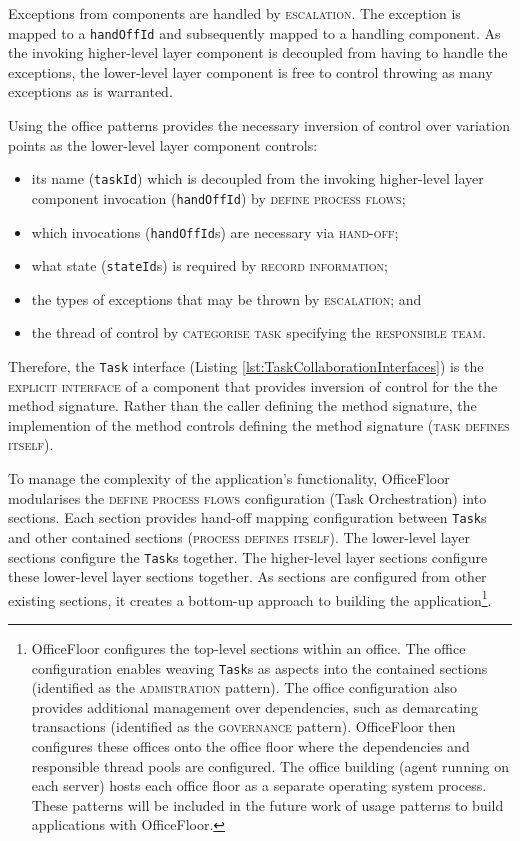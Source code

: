 \documentclass[prodmode]{style/acmlarge}
\begin{document}
Exceptions from components are handled by \textsc{escalation}.  The
exception is mapped to a \texttt{handOffId} and subsequently mapped to a
handling component.  As the invoking higher-level layer component is decoupled
from having to handle the exceptions, the lower-level layer component is free to
control throwing as many exceptions as is warranted.

Using the office patterns provides the necessary inversion of control over
variation points as the lower-level layer component controls:
\begin{itemize}
  \item its name (\texttt{taskId}) which is decoupled from the invoking higher-level layer component invocation (\texttt{handOffId}) by \textsc{define process flows};
  \item which invocations (\texttt{handOffId}s) are necessary via \textsc{hand-off};
  \item what state (\texttt{stateId}s) is required by \textsc{record information};
  \item the types of exceptions that may be thrown by \textsc{escalation}; and
  \item the thread of control by \textsc{categorise task} specifying the \textsc{responsible team}.
\end{itemize}

Therefore, the \texttt{Task} interface (Listing
\ref{lst:TaskCollaborationInterfaces}) is the \textsc{explicit interface} of a
component that provides inversion of control for the the method signature. 
Rather than the caller defining the method signature, the implemention of the
method controls defining the method signature (\textsc{task defines itself}).

To manage the complexity of the application's functionality, OfficeFloor
modularises the \textsc{define process flows} configuration (Task Orchestration)
into sections.  Each section provides hand-off mapping configuration between
\texttt{Task}s and other contained sections (\textsc{process defines itself}).
The lower-level layer sections configure the \texttt{Task}s together.  The
higher-level layer sections configure these lower-level layer sections together.
As sections are configured from other existing sections, it creates a bottom-up
approach to building the application\footnote{OfficeFloor configures the
top-level sections within an office.  The office configuration enables weaving
\texttt{Task}s as aspects into the contained sections (identified as the
\textsc{admistration} pattern).  The office configuration also provides
additional management over dependencies, such as demarcating transactions
(identified as the \textsc{governance} pattern). OfficeFloor then configures
these offices onto the office floor where the dependencies and responsible
thread pools are configured.  The office building (agent running on each server)
hosts each office floor as a separate operating system process.  These patterns
will be included in the future work of usage patterns to build applications with
OfficeFloor.}.
\end{document}
